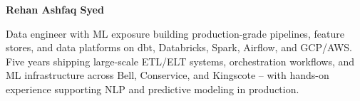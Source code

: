 \documentclass[25pt]{resume}
\begin{document}
\fontsize{11.5pt}{15.5pt}\selectfont

\begin{center}
    {\Huge \textbf{Rehan Ashfaq Syed}}\\[4pt]
\end{center}

\begin{center}
Data engineer with ML exposure building production-grade pipelines, feature stores, and data platforms on dbt, Databricks, Spark, Airflow, and GCP/AWS. Five years shipping large-scale ETL/ELT systems, orchestration workflows, and ML infrastructure across Bell, Conservice, and Kingscote -- with hands-on experience supporting NLP and predictive modeling in production.
\end{center}
\end{document}
